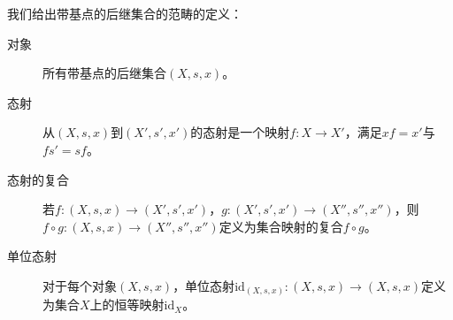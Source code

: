 \documentclass[oneside, 12pt]{ctexart}
\begin{document}
我们给出带基点的后继集合的范畴的定义：
\begin{description}
	\item[对象] 所有带基点的后继集合$(X, s, x)$。
	\item[态射] 从$(X, s, x)$到$(X', s', x')$的态射是一个映射$f \colon X \to X'$，满足$xf = x'$与$fs' = sf$。
	\item[态射的复合] 若$f \colon (X, s, x) \to (X', s', x')$，$g \colon (X', s', x') \to (X'', s'', x'')$，则$f \circ g \colon (X, s, x) \to (X'', s'', x'')$定义为集合映射的复合$f \circ g$。
	\item[单位态射] 对于每个对象$(X, s, x)$，单位态射$\text{id}_{(X, s, x)} \colon (X, s, x) \to (X, s, x)$定义为集合$X$上的恒等映射$\text{id}_X$。
\end{description}
\end{document}
